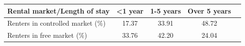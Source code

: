 \begin{table}[p]
\footnotesize
\renewcommand{\arraystretch}{1.2}
\begin{center}
\begin{tabular}{lcccc}
\toprule
Rental market/Length of stay & <1 year & 1-5 years & Over 5 years\\ 
\midrule
Renters in controlled market (\%) & 17.37 & 33.91 & 48.72\\
Renters in free market (\%) & 33.76 & 42.20 & 24.04 \\
\bottomrule
\end{tabular}
\end{center}
\normalsize
\end{table}
